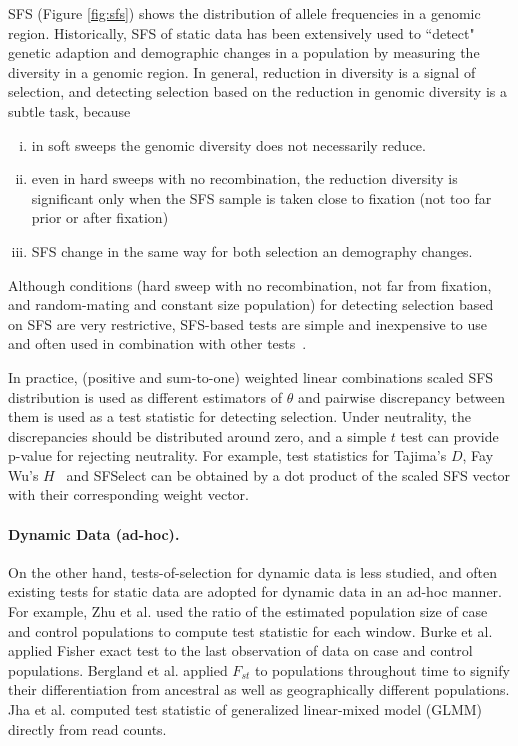 \documentclass[11pt]{article}
\begin{document}
SFS (Figure \ref{fig:sfs}) shows the distribution of allele 
frequencies in a genomic region.
Historically, SFS of static data has been extensively used to 
``detect" genetic 
adaption and demographic changes in a population by measuring the diversity in a genomic region. 
In general, reduction in diversity is a signal of 
selection, and detecting selection based on the reduction in 
genomic diversity is a subtle task, because 
\begin{enumerate}[(i)]
	\item  in soft sweeps the genomic diversity does not 
	necessarily reduce.
	\item even in hard sweeps with no recombination, the 
	reduction diversity is 
	significant only when the SFS sample is taken close to 
	fixation (not too 
	far prior or after fixation)
	\item SFS change in the same way for both selection an 
	demography changes. 
\end{enumerate}

Although conditions (hard sweep with no recombination, not 
far from 
fixation, and random-mating and constant size population) 
for detecting 
selection based on SFS are very restrictive, SFS-based tests 
are simple and 
inexpensive to use and often used in combination with 
other tests~\cite{akey2009constructing,vitti2013detecting}. 

In practice, (positive and sum-to-one) weighted 
linear combinations scaled SFS distribution \cite{achaz2009frequency}
is used as different estimators of $\theta$ and pairwise discrepancy between 
them is used as a test statistic for detecting selection.
Under neutrality, the discrepancies should be distributed around zero, and a 
simple $t$ test can provide p-value for rejecting neutrality. 
For example, 
test statistics for Tajima's $D$\cite{tajima1989statistical}, 
Fay Wu's $H$~\cite{fay2000hitchhiking} and 
SFSelect\cite{ronen2013learning} can be obtained by a dot 
product of the scaled SFS vector with their corresponding weight vector. 




\paragraph{Dynamic Data (ad-hoc).} On the other hand, tests-of-selection for 
dynamic 
data is less studied, and 
often existing tests for static data are adopted for dynamic data in an ad-hoc 
manner. For example, Zhu et al. \cite{zhou2011experimental} used the ratio of 
the estimated 
population size of case and control populations to compute test statistic for 
each window.
Burke et al.~\cite{burke2010genome} applied 
 Fisher exact test to the last observation of data on case and control 
 populations.
 Bergland et al. \cite{bergland2014genomic} 
 applied $F_{st}$ to populations throughout time to signify their 
 differentiation from ancestral as well as geographically different 
 populations. 
 Jha et al. \cite{jha2015whole} 
 computed test statistic of generalized 
 linear-mixed model (GLMM) directly from read counts. 
\end{document}
